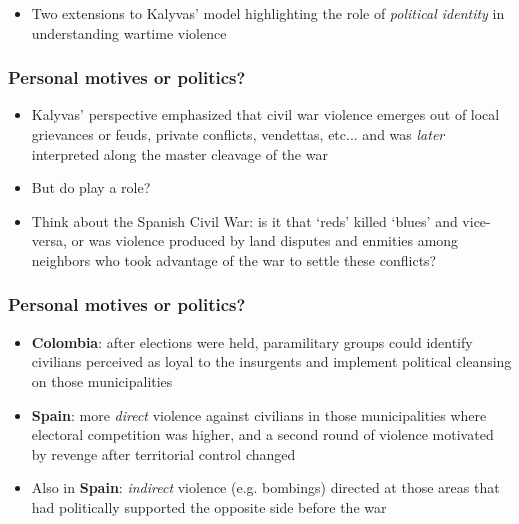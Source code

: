\documentclass[aspectratio=43]{beamer}
\begin{document}
\begin{frame}
\vspace{10pt}

\begin{itemize}
  \item Two extensions to Kalyvas' model highlighting the role of \textit{political identity} in understanding wartime violence
\end{itemize}

\end{frame}

\begin{frame}
\frametitle{Personal motives or politics?}
\centering

\begin{itemize}
  \item<1-> Kalyvas' perspective emphasized that civil war violence emerges out of local grievances or feuds, private conflicts, vendettas, etc... and was \textit{later} interpreted along the master cleavage of the war
  \item<2-> But do  play a role?
  \item<2-> Think about the Spanish Civil War: is it that `reds' killed `blues' and vice-versa, or was violence produced by land disputes and enmities among neighbors who took advantage of the war to settle these conflicts?
\end{itemize}

\end{frame}


\begin{frame}
\frametitle{Personal motives or politics?}
\centering

\begin{itemize}
  \item \textbf{Colombia}: after elections were held, paramilitary groups could identify civilians perceived as loyal to the insurgents and implement political cleansing on those municipalities
  \item \textbf{Spain}: more \textit{direct} violence against civilians in those municipalities where electoral competition was higher, and a second round of violence motivated by revenge after territorial control changed
  \item Also in \textbf{Spain}: \textit{indirect} violence (e.g. bombings) directed at those areas that had politically supported the opposite side before the war
\end{itemize}

\end{frame}
\end{document}
